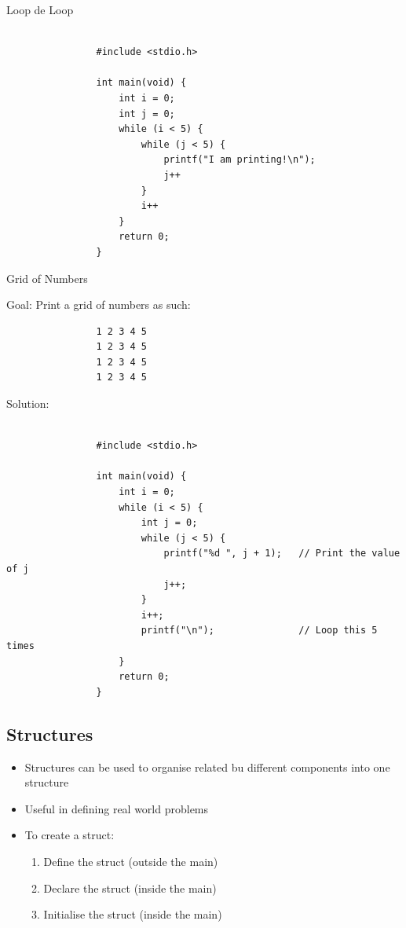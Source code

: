 \documentclass{article}
\begin{document}
		\begin{question}{Loop de Loop}
			\begin{verbatim}
				
				#include <stdio.h>

				int main(void) {
					int i = 0;
					int j = 0;
					while (i < 5) {
						while (j < 5) {
							printf("I am printing!\n");
							j++
						}
						i++
					}
					return 0;
				}

			\end{verbatim}
			
		\end{question}

		\begin{question}{Grid of Numbers}

			Goal: Print a grid of numbers as such:

			\begin{verbatim}
				1 2 3 4 5
				1 2 3 4 5
				1 2 3 4 5
				1 2 3 4 5
			\end{verbatim}

			Solution:

			\begin{verbatim}

				#include <stdio.h>

				int main(void) {
					int i = 0;
					while (i < 5) {
						int j = 0;
						while (j < 5) {
							printf("%d ", j + 1);	// Print the value of j
							j++;
						}
						i++;
						printf("\n");				// Loop this 5 times
					}
					return 0;
				}

			\end{verbatim}

		\end{question}

	\subsection{Structures}
		
		\begin{itemize}
			\item Structures can be used to organise related bu different components into one structure
			\item Useful in defining real world problems
			\item To create a struct:
				\begin{enumerate}
					\item Define the struct (outside the main)
					\item Declare the struct (inside the main)
					\item Initialise the struct (inside the main)
				\end{enumerate}
		\end{itemize}
\end{document}
